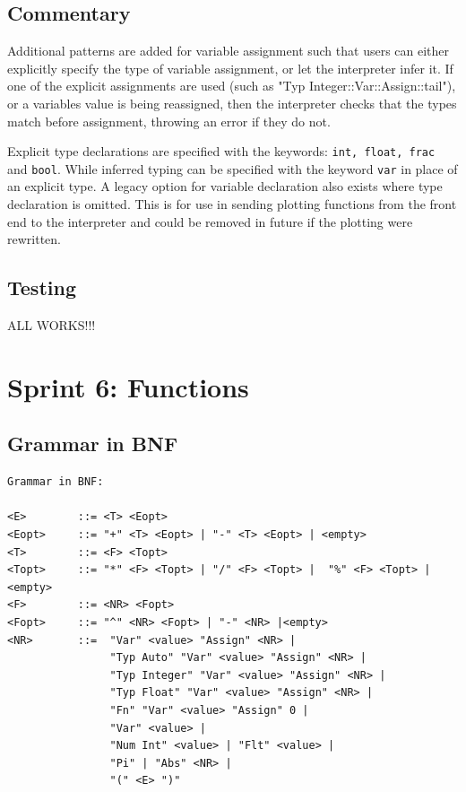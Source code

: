\documentclass[a4paper, oneside, 11pt]{report}
\begin{document}
    \subsection{Commentary}
    Additional patterns are added for variable assignment such that users can either explicitly specify the type of variable assignment, or let the interpreter infer it.
    If one of the explicit assignments are used (such as "Typ Integer::Var::Assign::tail"), or a variables value is being reassigned, then the interpreter checks that the types match before assignment, throwing an error if they do not.

    Explicit type declarations are specified with the keywords: \verb|int, float, frac| and \verb|bool|.
    While inferred typing can be specified with the keyword \verb|var| in place of an explicit type.
    A legacy option for variable declaration also exists where type declaration is omitted.
    This is for use in sending plotting functions from the front end to the interpreter and could be removed in future if the plotting were rewritten.

    \subsection{Testing}
    ALL WORKS!!!


    \clearpage
    \section{Sprint 6: Functions}
    \subsection{Grammar in BNF}
    \begin{verbatim}
Grammar in BNF:

<E>        ::= <T> <Eopt>
<Eopt>     ::= "+" <T> <Eopt> | "-" <T> <Eopt> | <empty>
<T>        ::= <F> <Topt>
<Topt>     ::= "*" <F> <Topt> | "/" <F> <Topt> |  "%" <F> <Topt> |<empty>
<F>        ::= <NR> <Fopt>
<Fopt>     ::= "^" <NR> <Fopt> | "-" <NR> |<empty>
<NR>       ::=  "Var" <value> "Assign" <NR> |
                "Typ Auto" "Var" <value> "Assign" <NR> |
                "Typ Integer" "Var" <value> "Assign" <NR> |
                "Typ Float" "Var" <value> "Assign" <NR> |
                "Fn" "Var" <value> "Assign" 0 |
                "Var" <value> |
                "Num Int" <value> | "Flt" <value> |
                "Pi" | "Abs" <NR> |
                "(" <E> ")"
    \end{verbatim}
\end{document}
